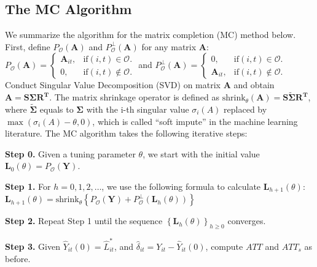 \documentclass[12pt]{article}
\let\oldcenter\center
\let\oldendcenter\endcenter
\renewenvironment{center}{\setlength\topsep{0pt}\oldcenter}{\oldendcenter}
\begin{document}
\subsection{The MC Algorithm}

We summarize the algorithm for the matrix completion (MC) method below. First, define $P_{\mathcal{O}}(\mathbf{A})$ and $P^{\bot}_{\mathcal{O}}(\mathbf{A})$ for any matrix $\mathbf{A}$: 
\begin{center}
$P_{\mathcal{O}}(\mathbf{A})=\begin{cases}
    \mathbf{A}_{it}, & \text{if} (i, t) \in \mathcal{O}.\\
    0, & \text{if} (i, t) \notin \mathcal{O}.
  \end{cases}$ \quad  and \quad 
$P^{\bot}_{\mathcal{O}}(\mathbf{A})=\begin{cases}
    0, & \text{if} (i, t) \in \mathcal{O}.\\
    \mathbf{A}_{it}, & \text{if} (i, t) \notin \mathcal{O}.
  \end{cases}$
\end{center}
\noindent Conduct Singular Value Decomposition (SVD) on matrix $\mathbf{A}$ and obtain $\mathbf{A} = \mathbf{S} \mathbf{\Sigma} \mathbf{R^T}$. The matrix shrinkage operator is defined as $\text{shrink}_{\theta}(\mathbf{A}) = \mathbf{S} \mathbf{\tilde{\Sigma}} \mathbf{R^T}$, where $\mathbf{\tilde{\Sigma}}$ equals to $\mathbf{\Sigma}$ with the i-th singular value $\sigma_{i}(A)$ replaced by $\max(\sigma_{i}(A) - \theta, 0)$, which is called ``soft impute'' in the machine learning literature. The MC algorithm takes the following iterative steps:
\begin{adjustwidth}{20pt}{20pt}\small
\noindent\textbf{Step 0.} Given a tuning parameter $\theta$, we start with the initial value $\mathbf{L}_{0}(\theta) = P_{\mathcal{O}}(\mathbf{Y})$.

\noindent\textbf{Step 1.} For $h = 0,1,2,\hdots$, we use the following formula to calculate $\mathbf{L}_{h+1}(\theta)$:
\begin{center}
$\mathbf{L}_{h+1}(\theta) = \text{shrink}_{\theta}\left\lbrace P_{\mathcal{O}}(\mathbf{Y}) + P^{\bot}_{\mathcal{O}}(\mathbf{L}_{h}(\theta)) \right\rbrace$
\end{center}

\noindent\textbf{Step 2.} Repeat Step 1 until the sequence $\left\lbrace \mathbf{L}_{h}(\theta) \right\rbrace_{h \geq 0}$ converges.

\noindent\textbf{Step 3.} Given $\hat{Y}_{it}(0) = \hat{L}_{it}^*$, and $\hat{\delta}_{it} = Y_{it} - \hat{Y}_{it}(0)$, compute $ATT$ and $ATT_{s}$ as before.
\end{adjustwidth}
\end{document}
